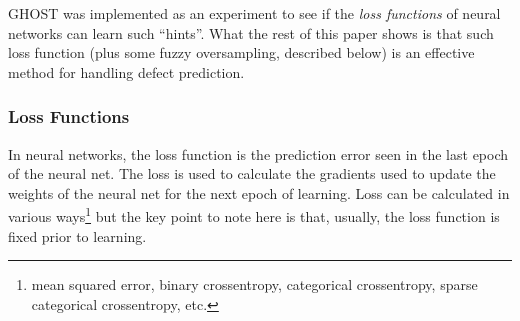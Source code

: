 \documentclass[10pt,compsoc,twocolumn]{IEEEtran}
\begin{document}
GHOST was  implemented as an experiment
to see if the   {\em loss functions} of neural networks can learn such ``hints''.
What the rest of this paper   shows is that
 such loss function
 (plus some
fuzzy oversampling, described below) is an effective
method for handling defect prediction.

\subsubsection{Loss Functions}
\label{sec:loss}
In neural networks, the loss function is the prediction error seen in the last epoch of the
neural net. The loss is used to calculate the gradients used to  update the weights of the neural net for the next epoch of learning. 
Loss can be calculated in various ways\footnote{ 
mean squared error,  
binary crossentropy, 
categorical crossentropy,
sparse categorical crossentropy, etc. } but the key point to note here is that, usually, the loss function is fixed prior to learning.
\end{document}
